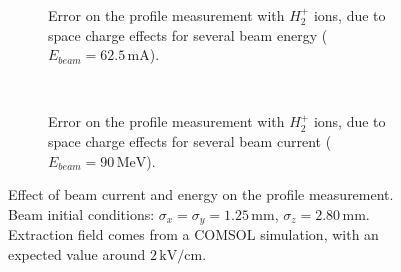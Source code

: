 \begin{figure}[!ht]
	\begin{subfigure}[t]{0.5\textwidth}
		
		\caption{Error on the profile measurement with $H_{2}^{+}$ ions, due to space charge effects for several beam energy ($E_{beam}=62.5\,\mathrm{mA}$).}
		\label{chap3:fig:SC_a}
	\end{subfigure}
	~
	\begin{subfigure}[t]{0.5\textwidth}
		
		\caption{Error on the profile measurement with $H_{2}^{+}$ ions, due to space charge effects for several beam current ($E_{beam}=90\,\mathrm{MeV}$).}
		\label{chap3:fig:SC_b}
	\end{subfigure}
	\caption[Effect of beam current and energy on the profile measurement]{Effect of beam current and energy on the profile measurement. Beam initial conditions: $\sigma_{x}=\sigma_{y}=1.25\,\mathrm{mm}$, $\sigma_{z} = 2.80\,\mathrm{mm}$. Extraction field comes from a COMSOL simulation, with an expected value around $2\,\mathrm{kV/cm}$.}
	\label{chap3:fig:SC}
\end{figure}


